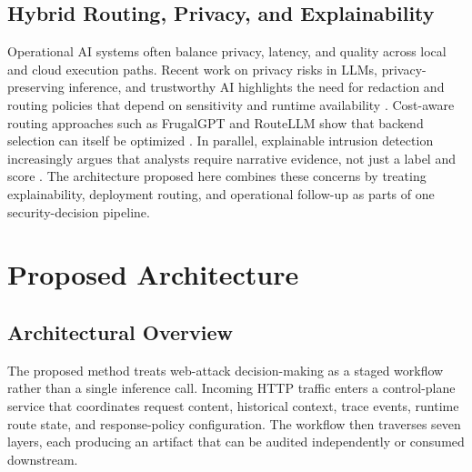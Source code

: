 \documentclass{ieeeaccess}
\begin{document}
\subsection{Hybrid Routing, Privacy, and Explainability}
Operational AI systems often balance privacy, latency, and quality across local and cloud execution paths. Recent work on privacy risks in LLMs, privacy-preserving inference, and trustworthy AI highlights the need for redaction and routing policies that depend on sensitivity and runtime availability \cite{chen2025privacy,tang2024dpicl,feretzakis2024trustworthy}. Cost-aware routing approaches such as FrugalGPT and RouteLLM show that backend selection can itself be optimized \cite{chen2023frugalgpt,ong2024routellm}. In parallel, explainable intrusion detection increasingly argues that analysts require narrative evidence, not just a label and score \cite{neupane2022xids,hermosilla2025systems,hermosilla2025forensic}. The architecture proposed here combines these concerns by treating explainability, deployment routing, and operational follow-up as parts of one security-decision pipeline.

\section{Proposed Architecture}
\label{sec:architecture}

\subsection{Architectural Overview}
The proposed method treats web-attack decision-making as a staged workflow rather than a single inference call. Incoming HTTP traffic enters a control-plane service that coordinates request content, historical context, trace events, runtime route state, and response-policy configuration. The workflow then traverses seven layers, each producing an artifact that can be audited independently or consumed downstream.
\end{document}
